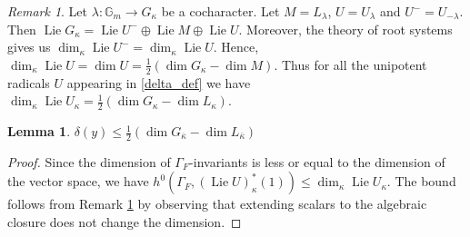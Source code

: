 \documentclass{amsart}
\newtheorem{lem}[prop]{Lemma}
\theoremstyle{definition}
\theoremstyle{remark}
\newtheorem{remar}[prop]{Remark}
\newcommand{\Gm}{\mathbb G_{m}}
\newcommand{\kappabar}{\overline{\kappa}}
\DeclareMathOperator{\Lie}{Lie}
\begin{document}
\begin{remar}\label{dim_U_same} Let $\lambda: \Gm \rightarrow G_{\kappa}$ be a cocharacter.
Let $M=L_{\lambda}$, $U=U_{\lambda}$ and $U^-= U_{-\lambda}$.
Then 
$ \Lie G_{\kappa} = \Lie U^-\oplus \Lie M \oplus \Lie U.$
Moreover, the theory of root systems gives us $\dim_{\kappa} \Lie U^{-}=\dim_{\kappa} \Lie U$. 
Hence, $\dim_{\kappa} \Lie U=\dim U = \frac{1}{2} ( \dim G_{\kappa} - \dim M).$
Thus for all the unipotent radicals $U$ appearing in \eqref{delta_def}  we have 
 $\dim_{\kappa} \Lie U_{\kappa}= \frac{1}{2} ( \dim G_{\kappa} - \dim L_{\kappa}).$
\end{remar} 

\begin{lem}\label{bound_defect} $\delta(y)\le \frac{1}{2}(\dim G_{\kappabar} - \dim L_{\kappabar})$
\end{lem}
\begin{proof} Since the dimension of $\Gamma_F$-invariants is less or equal to the dimension 
of the vector space, we have $h^0(\Gamma_F, (\Lie U)_{\kappa}^*(1))\le \dim_{\kappa} \Lie U_{\kappa}$. 
The bound follows from Remark \ref{dim_U_same} by observing that extending scalars to the algebraic 
closure does not change the dimension.
\end{proof}
\end{document}
